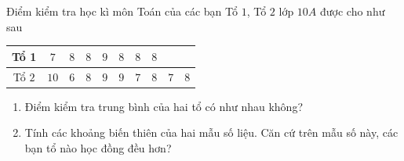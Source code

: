 \begin{bt}%
	Điểm kiểm tra học kì môn Toán của các bạn Tổ $1$, Tổ $2$ lớp $10A$ được cho như sau 
	\begin{center}
		\begin{tabular}{|c|c|c|c|c|c|c|c|c|c|}
			\hline
			Tổ 1 & $7$ & $8$ & $8$ & $9$ & $8$ & $8$ & $8$ &  &  \\
			\hline
			Tổ $2$ & $10$ & $6$ & $8$ & $9$ & $9$ & $7$ & $8$ & $7$ & $8$ \\
			\hline
		\end{tabular}
	\end{center}
	\begin{enumerate}
		\item Điểm kiểm tra trung bình của hai tổ có như nhau không?
		\item Tính các khoảng biến thiên của hai mẫu số liệu. Căn cứ trên mẫu số này, các bạn tổ nào học đồng đều hơn?
	\end{enumerate}
\end{bt}

